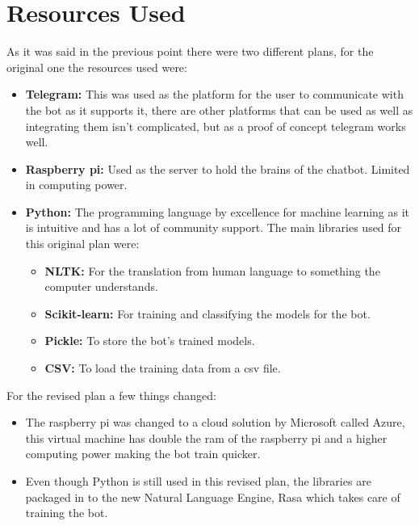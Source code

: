 \section{Resources Used}\label{sec:chap1_res}
As it was said in the previous point there were two different plans, for the original one the resources used were:\\	
\begin{itemize}
	\item{\textbf{Telegram:} This was used as the platform for the user to communicate with the bot as it supports it, there are other platforms that can be used as well as integrating them isn’t complicated, but as a proof of concept telegram works well.}
	\item{\textbf{Raspberry pi:} Used as the server to hold the brains of the chatbot. Limited in computing power.}
	\item{\textbf{Python:} The programming language by excellence for machine learning as it is intuitive and has a lot of community support. The main libraries used for this original plan were:
		\begin{itemize}
			\item{\textbf{NLTK:} For the translation from human language to something the computer understands.}
			\item{\textbf{Scikit-learn:} For training and classifying the models for the bot.}
			\item{\textbf{Pickle:} To store the bot’s trained models.}
			\item{\textbf{CSV:} To load the training data from a csv file.}
		\end{itemize}	 
	}
\end{itemize}
For the revised plan a few things changed:
\begin{itemize}
\item{The raspberry pi was changed to a cloud solution by Microsoft called Azure, this virtual machine has double the ram of the raspberry pi and a higher computing power making the bot train quicker.}
\item{Even though Python is still used in this revised plan, the libraries are packaged in to the new Natural Language Engine, Rasa which takes care of training the bot.}
\end{itemize}
	
